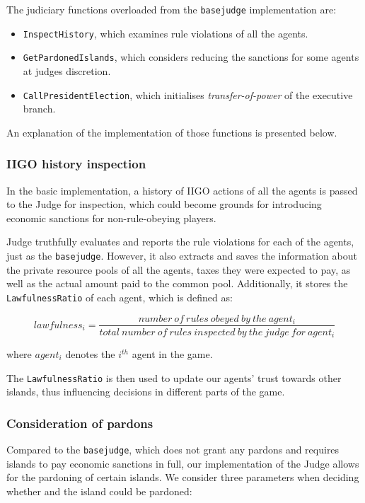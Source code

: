 The judiciary functions overloaded from the \texttt{basejudge} implementation are:
\begin{itemize}
    \item \texttt{InspectHistory}, which examines rule violations of all the agents.
    \item \texttt{GetPardonedIslands}, which considers reducing the sanctions for some agents at judges discretion.
    \item \texttt{CallPresidentElection}, which initialises \emph{transfer-of-power} of the executive branch.
\end{itemize}
An explanation of the implementation of those functions is presented below.

\subsubsection{IIGO history inspection}
\label{subsubsec:team4:judge:inspect_history}
In the basic implementation, a history of IIGO actions of all the agents is passed to the Judge for inspection, which could become grounds for introducing economic sanctions for non-rule-obeying players. 

Judge truthfully evaluates and reports the rule violations for each of the agents, just as the \texttt{basejudge}. However, it also extracts and saves the information about the private resource pools of all the agents, taxes they were expected to pay, as well as the actual amount paid to the common pool. Additionally, it stores the \texttt{LawfulnessRatio} of each agent, which is defined as:


\begin{equation}
    lawfulness_{i} = \frac{number\:of\:rules\:obeyed\:by\:the\:agent_{i}}{total\:number\:of\:rules\:inspected\:by\:the\:judge\:for\:agent_{i}}
\end{equation}

where $agent_{i}$ denotes the $i^{th}$ agent in the game.  

The \texttt{LawfulnessRatio} is then used to update our agents' trust towards other islands, thus influencing decisions in different parts of the game. 

\subsubsection{Consideration of pardons}
Compared to the \texttt{basejudge}, which does not grant any pardons and requires islands to pay economic sanctions in full, our implementation of the Judge allows for the pardoning of certain islands. We consider three parameters when deciding whether and the island could be pardoned:

